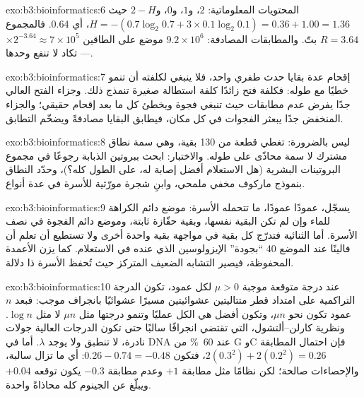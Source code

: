 \begin{solution}{exo:b3:bioinformatics:6}
المحتويات المعلوماتية: $2$، و$1$، و$0$، و$2 - H$ حيث $H = -(0.7\log_{2}
0.7 + 3\times 0.1\log_{2} 0.1) = 0.36 + 1.00 = 1.36$، أي $0.64$. فالمجموع
$R = 3.64$ بتّ. والمطابقات المصادفة: $9.2\times 10^{6}$ موضع على الطاقين
$\times 2^{-3.64} \approx 7\times 10^{5}$ --- 
تكاد لا تنفع وحدها.
\end{solution}

\begin{solution}{exo:b3:bioinformatics:7}
إقحام عدة بقايا حدث طفري واحد، فلا ينبغي لكلفته
أن تنمو خطيًا مع طوله: فكلفة فتح زائدًا كلفة استطالة
صغيرة تنمذج ذلك. وجزاء الفتح العالي جدًا يفرض
عدم مطابقات حيث تنبغي فجوة ويخطئ  كل ما بعد
إقحام حقيقي؛ والجزاء المنخفض جدًا يبعثر الفجوات في كل مكان، فيطابق
البقايا مصادفةً ويضخّم التطابق.
\end{solution}

\begin{solution}{exo:b3:bioinformatics:8}
ليس بالضرورة:  تغطي قطعة من \num{130} بقية،
وهي سمة نطاق مشترك لا سمة 
محاذًى على طوله. والاختبار: ابحث ببروتين الذبابة رجوعًا في
مجموع البروتينات البشرية (هل الاستعلام أفضل إصابة له، على الطول كله؟)،
وحدّد النطاق بنموذج ماركوف مخفي ملمحي، وابنِ شجرة مورّثية للأسرة
في عدة أنواع.
\end{solution}

\begin{solution}{exo:b3:bioinformatics:9}
 يسجّل، عمودًا عمودًا، ما تتحمله الأسرة: موضع
دائم الكراهة للماء وإن لم تكن البقية نفسها، وبقية حفّازة
ثابتة، وموضع دائم الفجوة في نصف
الأسرة. أما  الثنائية فتدرّج كل بقية في مواجهة بقية
واحدة أخرى ولا تستطيع أن تعلم أن فالينًا عند الموضع 40 ``بجودة''
الإيزولوسين الذي عنده في الاستعلام. كما يزن 
الأعمدة المحفوظة، فيصير التشابه الضعيف المتركز حيث تُحفظ
الأسرة ذا دلالة.
\end{solution}

\begin{solution}{exo:b3:bioinformatics:10}
عند درجة متوقعة موجبة $\mu > 0$ لكل عمود، تكون الدرجة التراكمية
على امتداد قطر متتاليتين عشوائيتين مسيرًا عشوائيًا بانجراف
موجب: فبعد $n$ عمود تكون نحو $\mu n$، وتكون أفضل
 هي الكل عمليًا وتنمو درجتها مثل
$\mu n$ لا مثل $\log n$. ونظرية كارلن--ألتشول، التي
تقتضي انجرافًا سالبًا حتى تكون الدرجات العالية جولات نادرة،
لا تنطبق ولا يوجد $\lambda$. أما في DNA عند \qty{60}{\%} من G وC فإن
احتمال المطابقة $2(0.3^{2}) + 2(0.2^{2}) = 0.26$، فتكون  $0.26 - 0.74 = -0.48$: أي ما تزال سالبة، والإحصاءات
صالحة؛ لكن نظامًا مثل مطابقة $+1$ وعدم مطابقة $-0.3$ يكون توقعه
$+0.04$ ويبلّغ عن الجينوم كله محاذاةً واحدة.
\end{solution}

